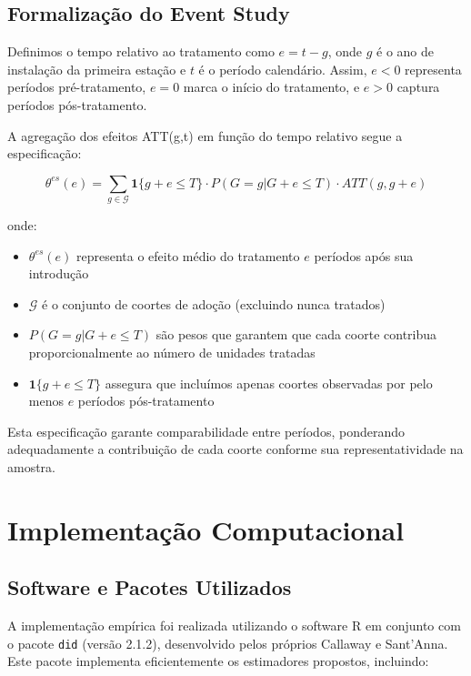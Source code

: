 \documentclass[
	12pt,				%
	openright,			%
	oneside,			%
	a4paper,			%
	english,			%
	french,				%
	spanish,			%
	brazil				%
	]{abntex2}
\begin{document}
\subsection{Formalização do Event Study}

Definimos o tempo relativo ao tratamento como $e = t - g$, onde $g$ é o ano de instalação da primeira estação e $t$ é o período calendário. Assim, $e < 0$ representa períodos pré-tratamento, $e = 0$ marca o início do tratamento, e $e > 0$ captura períodos pós-tratamento.

A agregação dos efeitos ATT(g,t) em função do tempo relativo segue a especificação:

\begin{equation}
\theta^{es}(e) = \sum_{g \in \mathcal{G}} \mathbf{1}\{g + e \leq T\} \cdot P(G = g | G + e \leq T) \cdot ATT(g, g+e)
\end{equation}

onde:
\begin{itemize}
\item $\theta^{es}(e)$ representa o efeito médio do tratamento $e$ períodos após sua introdução
\item $\mathcal{G}$ é o conjunto de coortes de adoção (excluindo nunca tratados)
\item $P(G = g | G + e \leq T)$ são pesos que garantem que cada coorte contribua proporcionalmente ao número de unidades tratadas
\item $\mathbf{1}\{g + e \leq T\}$ assegura que incluímos apenas coortes observadas por pelo menos $e$ períodos pós-tratamento
\end{itemize}

Esta especificação garante comparabilidade entre períodos, ponderando adequadamente a contribuição de cada coorte conforme sua representatividade na amostra.

\section{Implementação Computacional}

\subsection{Software e Pacotes Utilizados}

A implementação empírica foi realizada utilizando o software R \cite{rcoreteam2024} em conjunto com o pacote \texttt{did} (versão 2.1.2), desenvolvido pelos próprios Callaway e Sant'Anna. Este pacote implementa eficientemente os estimadores propostos, incluindo:
\end{document}
